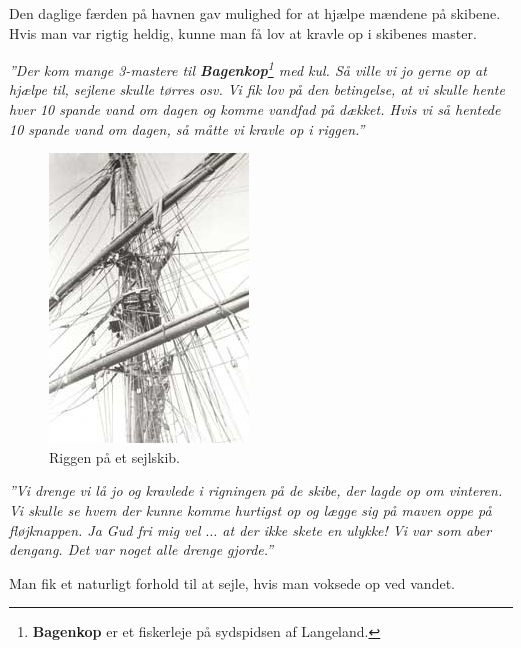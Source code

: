 Den daglige færden på havnen gav mulighed for at hjælpe mændene på
skibene. Hvis man var rigtig heldig, kunne man få lov at kravle op i
skibenes master.

\emph{''Der kom mange 3-mastere til \textbf{Bagenkop}\footnote{\textbf{Bagenkop}
  er et fiskerleje på sydspidsen af Langeland.} med kul. Så ville vi jo
gerne op at hjælpe til, sejlene skulle tørres osv. Vi fik lov på den
betingelse, at vi skulle hente hver 10 spande vand om dagen og komme
vandfad på dækket. Hvis vi så hentede 10 spande vand om dagen, så måtte
vi kravle op i riggen.''}


\begin{figure}
\centering
\includegraphics{images/sejlskibe_tema-1-riggen.jpg}
\caption{Riggen på et sejlskib.}
\end{figure}

\emph{''Vi drenge vi lå jo og kravlede i rigningen på de skibe, der
lagde op om vinteren. Vi skulle se hvem der kunne komme hurtigst op og
lægge sig på maven oppe på fløjknappen. Ja Gud fri mig vel \(\ldots\) at
der ikke skete en ulykke! Vi var som aber dengang. Det var noget alle
drenge gjorde.''}

Man fik et naturligt forhold til at sejle, hvis man voksede op ved
vandet.

